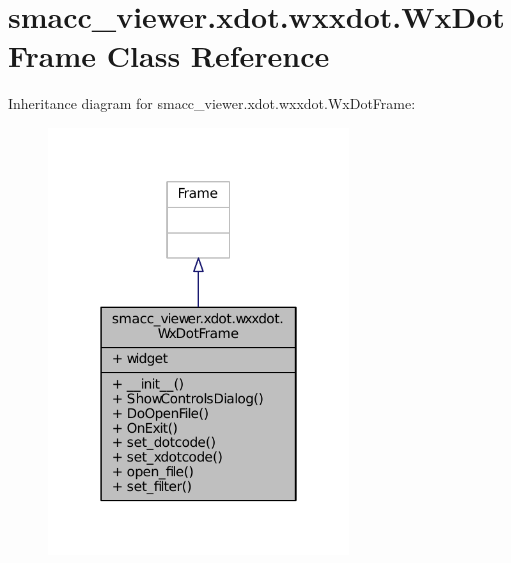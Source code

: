 \hypertarget{classsmacc__viewer_1_1xdot_1_1wxxdot_1_1WxDotFrame}{}\section{smacc\+\_\+viewer.\+xdot.\+wxxdot.\+Wx\+Dot\+Frame Class Reference}
\label{classsmacc__viewer_1_1xdot_1_1wxxdot_1_1WxDotFrame}


Inheritance diagram for smacc\+\_\+viewer.\+xdot.\+wxxdot.\+Wx\+Dot\+Frame\+:
\nopagebreak
\begin{figure}[H]
\begin{center}
\leavevmode
\includegraphics[width=226pt]{classsmacc__viewer_1_1xdot_1_1wxxdot_1_1WxDotFrame__inherit__graph}
\end{center}
\end{figure}


